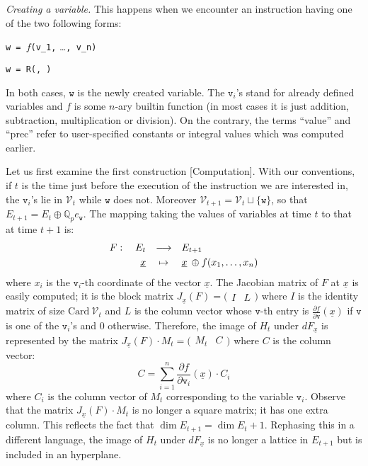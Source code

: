 \documentclass[sigconf]{acmart}
\newcommand{\Q}{\mathbb Q}
\newcommand{\Qp}{\Q_p}
\newcommand{\calV}{\mathcal{V}}
\newcommand{\ttv}{\texttt{v}\xspace}
\newcommand{\ttw}{\texttt{w}\xspace}
\theoremstyle{definition}
\begin{document}
\smallskip

\noindent \textit{Creating a variable.}
%
This happens when we encounter an instruction having one of the
two following forms:

\medskip

\noindent \hspace{5mm} \makebox[2.5cm]{[Computation]\hfill\null}
\verb?w = ?$f$\verb?(v_1,? \ldots\verb?, v_n)?

\smallskip

\noindent \hspace{5mm} 
\verb?w = ?\verb?R(?\verb?, ?\verb?)?

\medskip

\noindent
In both cases, $\ttw$ is the newly created variable. 
The $\ttv_i$'s stand for already defined variables and $f$ is some 
$n$-ary builtin function (in most cases it is just addition, 
subtraction, multiplication or division). On the contrary, the terms 
``value'' and ``prec'' refer to user-specified constants or integral 
values which was computed earlier.

\smallskip

Let us first examine the first construction [Computation].
With our conventions, if $t$ is the time just before the execution of 
the instruction we are interested in, the $\ttv_i$'s lie in $\calV_t$ 
while $\ttw$ does not. Moreover $\calV_{t+1} = \calV_t \sqcup \{\ttw\}$, 
so that $E_{t+1} = E_t \oplus \Qp e_\ttw$.
The mapping taking the values of variables at time $t$ to that at 
time $t{+}1$ is:
$$\begin{array}{rcl}
F: \quad E_t & \longrightarrow & E_{t+1} \smallskip \\
\underline x & \mapsto & \underline x \:\oplus f(x_1, \ldots, x_n)
\end{array}$$
where $x_i$ is the $\ttv_i$-th coordinate of the vector $\underline x$.
The Jacobian matrix of $F$ at $\underline x$ is easily computed; it 
is the block matrix $J_{\underline x}(F) = \big( \begin{matrix} I & L
\end{matrix} \big)$ where $I$ is the identity matrix of size $\text{Card}
\:\calV_t$ and $L$ is the column vector whose $\ttv$-th entry is
$\frac{\partial f}{\partial \ttv} (\underline x)$ if $\ttv$ is one of 
the $\ttv_i$'s and $0$ otherwise.
Therefore, the image of $H_t$ under $dF_{\underline x}$ is represented 
by the matrix $J_{\underline x}(F) \cdot M_t = \big( \begin{matrix} M_t & C
\end{matrix} \big)$ where $C$ is the column vector:
\begin{equation}
\label{eq:defC}
C = \sum_{i=1}^n \frac{\partial f}{\partial{\ttv_i}} (\underline x)
\cdot C_i
\end{equation}
where $C_i$ is the column vector of $M_t$ corresponding to the
variable $\ttv_i$.
Observe that the matrix $J_{\underline x}(F) \cdot M_t$ is no longer a 
square matrix; it has one extra column. This reflects the fact that 
$\dim E_{t+1} = \dim E_t + 1$. Rephasing this in a different language, 
the image of $H_t$ under $dF_{\underline x}$ is no longer a lattice in 
$E_{t+1}$ but is included in an hyperplane.
\end{document}
